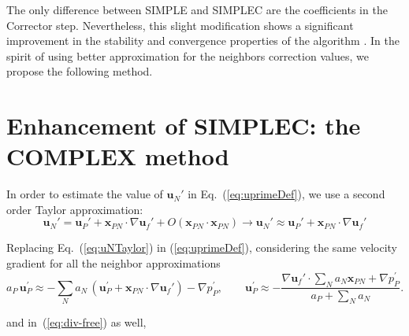 \documentclass[final,3p,times,10pt,onecolumn]{myElsarticle}
\numberwithin{equation}{section}
\begin{document}
The only difference between SIMPLE and SIMPLEC are the coefficients in the Corrector step. Nevertheless, this slight modification shows a significant improvement in the stability  and convergence properties of the algorithm \cite{liu}. In the spirit of using better approximation for the neighbors correction values, we propose the following method.

\section{Enhancement of SIMPLEC: the COMPLEX method}
\label{sec:COMPLEX}

In order to estimate the value of $\boldsymbol{u}_N'$ in Eq.~(\ref{eq:uprimeDef}), we use a second order Taylor approximation:
\begin{equation}\label{eq:uNTaylor}
\boldsymbol{u}_N' = \boldsymbol{u}_P' + \boldsymbol{x}_{PN}\cdot 
\nabla \boldsymbol{u}_f' + \mathcal{}{O}(\boldsymbol{x}_{PN} \cdot \boldsymbol{x}_{PN}) \rightarrow \boldsymbol{u}_N' \approx \boldsymbol{u}_P' + \boldsymbol{x}_{PN}\cdot \nabla \boldsymbol{u}_f'
\end{equation}

Replacing Eq.~(\ref{eq:uNTaylor}) in (\ref{eq:uprimeDef}), considering the same velocity gradient for all the neighbor approximations
\begin{equation}\label{eq:uPrimeCOMPLEX}
a_P\,\boldsymbol{u}_P^{'} \approx -\sum_{N} a_{N}\, \left(\boldsymbol{u}_P^{'} + \boldsymbol{x}_{PN}\cdot \nabla \boldsymbol{u}_f'\right)- \nabla p_P^{'}, \qquad \boldsymbol{u}_P^{'} \approx - \frac{\nabla \boldsymbol{u}_f' \cdot \sum_{N} a_{N}\boldsymbol{x}_{PN} + \nabla p_P^{'}}{a_P + \sum_{N} a_{N}} .
\end{equation}

\noindent and in~(\ref{eq:div-free}) as well,
\end{document}
